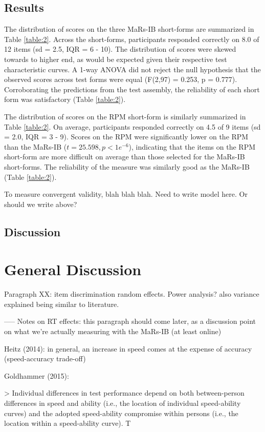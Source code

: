 \documentclass[a4paper,man,natbib]{apa6}
\begin{document}
\subsection{Results}

The distribution of scores on the three MaRs-IB short-forms are summarized in Table \ref{table:2}. Across the short-forms, participants responded correctly on 8.0 of 12 items (sd = 2.5, IQR = 6 - 10). The distribution of scores were skewed towards to higher end, as would be expected given their respective test characteristic curves. A 1-way ANOVA did not reject the null hypothesis that the observed scores across test forms were equal (F(2,97) = 0.253, p = 0.777). Corroborating the predictions from the test assembly, the reliability of each short form was satisfactory (Table \ref{table:2}). 

The distribution of scores on the RPM short-form is similarly summarized in Table \ref{table:2}. On average, participants responded correctly on 4.5 of 9 items (sd = 2.0, IQR = 3 - 9). Scores on the RPM were significantly lower on the RPM than the MaRs-IB ($t = 25.598, p < 1e^{-6}$), indicating that the items on the RPM short-form are more difficult on average than those selected for the MaRs-IB short-forms. The reliability of the measure was similarly good as the MaRs-IB (Table \ref{table:2}). 

To measure convergent validity, blah blah blah. Need to write model here. Or should we write above?

\subsection{Discussion}

\section{General Discussion}

Paragraph XX: item discrimination random effects. Power analysis? also variance explained being similar to literature.

-----
Notes on RT effects: this paragraph should come later, as a discussion point on what we're actually measuring with the MaRs-IB (at least online)

Heitz (2014): in general, an increase in speed comes at the expense of accuracy (speed-accuracy trade-off)

Goldhammer (2015): 

> Individual differences in test performance depend on both between-person differences in speed and ability (i.e., the location of individual speed-ability curves) and the adopted speed-ability compromise within persons (i.e., the location within a speed-ability curve). T
\end{document}
